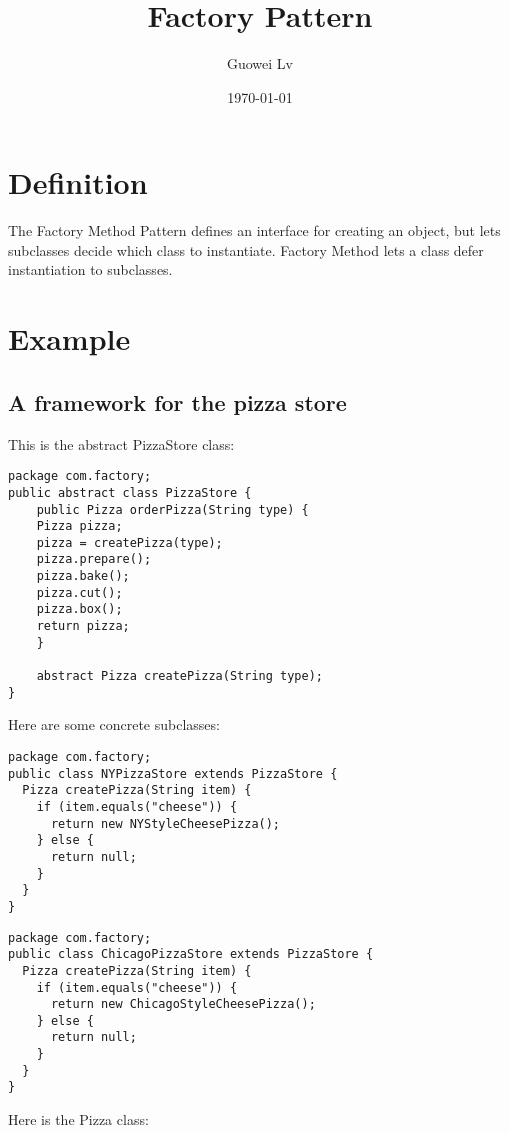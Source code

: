 \documentclass{article}
\author{Guowei Lv}
\date{\today}
\title{Factory Pattern}
\begin{document}
\maketitle
\tableofcontents


\section{Definition}
\label{sec-1}
The Factory Method Pattern defines an interface for creating an object, but lets subclasses decide which class to instantiate. Factory Method lets a class defer instantiation to subclasses.

\section{Example}
\label{sec-2}

\subsection{A framework for the pizza store}
\label{sec-2-1}

This is the abstract PizzaStore class:
\begin{verbatim}
package com.factory;
public abstract class PizzaStore {
    public Pizza orderPizza(String type) {
	Pizza pizza;
	pizza = createPizza(type);
	pizza.prepare();
	pizza.bake();
	pizza.cut();
	pizza.box();
	return pizza;
    }

    abstract Pizza createPizza(String type);
}
\end{verbatim}

Here are some concrete subclasses:

\begin{verbatim}
package com.factory;
public class NYPizzaStore extends PizzaStore {
  Pizza createPizza(String item) {
    if (item.equals("cheese")) {
      return new NYStyleCheesePizza();
    } else {
      return null;
    }
  }
}
\end{verbatim}

\begin{verbatim}
package com.factory;
public class ChicagoPizzaStore extends PizzaStore {
  Pizza createPizza(String item) {
    if (item.equals("cheese")) {
      return new ChicagoStyleCheesePizza();
    } else {
      return null;
    }
  }
}
\end{verbatim}


Here is the Pizza class:
\end{document}
